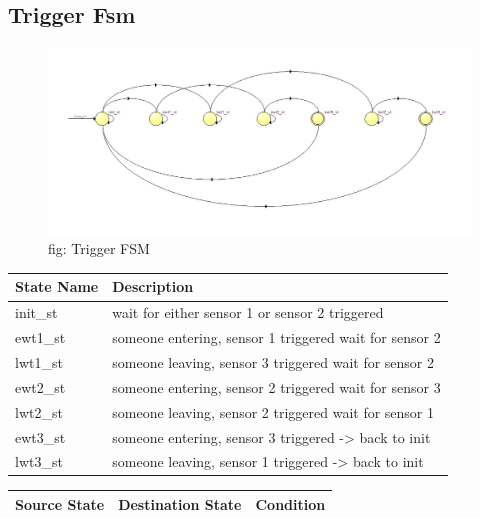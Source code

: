 \documentclass[12pt,a4 paper] {report}
\begin{document}
\newpage

\subsection{Trigger Fsm}
\begin{figure}[h]
	\centering	
	\includegraphics[scale=0.4]{../png/Trigger.png}
	\newline
	fig: Trigger FSM\\
\end{figure}
\begin{center}
 \begin{tabular}{| p{4cm} | p{7cm} |}
	 \hline
	 State Name & Description \\
	 \hline
	 init\_st & wait for either sensor 1 or sensor 2 triggered \\
	 \hline
	 ewt1\_st & someone entering, sensor 1 triggered wait for sensor 2 \\
	 \hline
	 lwt1\_st & someone leaving, sensor 3 triggered wait for sensor 2 \\
	 \hline
	 ewt2\_st & someone entering, sensor 2 triggered wait for sensor 3 \\
	 \hline
	 lwt2\_st & someone leaving, sensor 2 triggered wait for sensor 1 \\
	 \hline
	 ewt3\_st & someone entering, sensor 3 triggered -> back to init \\
	 \hline
	 lwt3\_st & someone leaving, sensor 1 triggered -> back to init \\
	 \hline
 \end{tabular}
\end{center}
\begin{center}
	\begin{tabular}{| p{2cm} | p{2cm} | p{11cm} |}
		\hline
		Source State& Destination State & Condition \\
		\hline	
		
			
	\end{tabular}	
\end{center}
\end{document}
